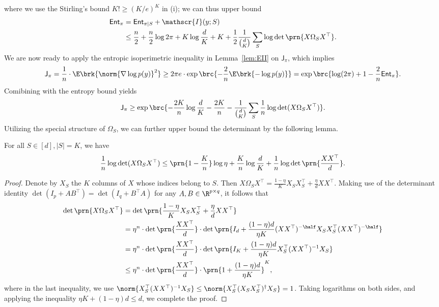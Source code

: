 \documentclass[11pt]{article}
\newcommand{\jfunc}{\mathsf{J}}
\begin{document}
where we use the Stirling's bound $K! \geq (K/e)^K$ in (i); we can thus upper bound
\begin{align*}
    \mathsf{Ent}_{\pi} & =\mathsf{Ent}_{\pi \mid S} + \mathscr{I}(y; S)  \nonumber \\
    & \leq \frac{n}{2} + \frac{n}{2} \log 2 \pi + K \log \frac{d}{K} + K + \frac{1}{2} \frac{1}{\binom{d}{K}} \sum_S \log  \det \prn{X \Omega_S X^\top}.
\end{align*}
We are now ready to apply the entropic isoperimetric inequality in Lemma~\ref{lem:EII} on $\jfunc_{\pi}$, which implies
\begin{align*}
    \jfunc_{\pi} = \frac{1}{n} \cdot \E \brk{\norm{\nabla \log p(y)}^2} \geq 2 \pi e \cdot \exp \brc{-\frac{2}{n} \E \brk{-\log p(y)}} = \exp\brc{\log (2\pi) + 1 - \frac{2}{n} \mathsf{Ent}_{\pi}}.
\end{align*}
Comibining with the entropy bound yields
\begin{align}
    \jfunc_{\pi} \geq \exp \brc{-\frac{2K}{n} \log \frac{d}{K} - \frac{2K}{n} - \frac{1}{\binom{d}{K}} \sum_S \frac{1}{n} \log \det (X\Omega_S X^\top) }. \label{eq:mixture-sparse-mid-1}
\end{align}
Utilizing the special structure of $\Omega_S$, we can further upper bound the determinant by the following lemma.
\begin{lemma} \label{lem:log-det-upper-bound}
    For all $S \in [d], |S|=K$, we have
    \begin{align*}
        \frac{1}{n} \log \det (X\Omega_S X^\top) \leq \prn{1 - \frac{K}{n}}\log \eta + \frac{K}{n} \log \frac{d}{K} + \frac{1}{n} \log \det \prn{\frac{XX^\top}{d}}.
    \end{align*}
\end{lemma}
\begin{proof}
    Denote by $X_S$ the $K$ columns of $X$ whose indices belong to $S$. Then $X\Omega_S X^\top = \frac{1-\eta}{K} X_S X_S^\top + \frac{\eta}{d} XX^\top$. Making use of the determinant identity $\det(I_p + AB^\top) = \det (I_q + B^\top A)$ for any $A, B \in \R^{p \times q}$, it follows that
    \begin{align*}
        \det \prn{X\Omega_S X^\top } & = \det \prn{\frac{1-\eta}{K} X_S X_S^\top + \frac{\eta}{d} XX^\top} \nonumber \\
        & = \eta^n \cdot \det \prn{\frac{XX^\top}{d}} \cdot \det \prn{I_d + \frac{(1-\eta)d}{\eta K} (XX^\top)^{-\half} X_S X_S^\top (XX^\top)^{-\half}}  \\
        & = \eta^n \cdot \det \prn{\frac{XX^\top}{d}} \cdot \det \prn{I_K + \frac{(1-\eta)d}{\eta K} X_S^\top (XX^\top)^{-1} X_S } \\
        & \leq \eta^n \cdot \det \prn{\frac{XX^\top}{d}} \cdot \prn{1 + \frac{(1-\eta)d}{\eta K}}^K,
    \end{align*}
    where in the last inequality, we use $\norm{X_S^\top (XX^\top)^{-1} X_S} \leq \norm{X_S^\top (X_SX_S^\top)^{\dagger} X_S} = 1$. Taking logarithms on both sides, and applying the inequality $\eta K + (1-\eta)d \leq d$, we complete the proof.
\end{proof}
\end{document}
